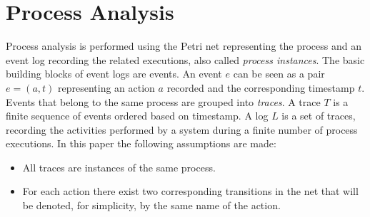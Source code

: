 \documentclass{llncs}
\begin{document}

\section{Process Analysis}\label{Background}
Process analysis is performed using the Petri net representing the process and an event log recording the related executions, also called \emph{process instances}. The basic building blocks of event logs are events. An event $e$ can be seen as a pair $e = (a,t)$ representing an action $a$ recorded and the corresponding timestamp $t$.  Events that belong to the same process are grouped into {\itshape traces}. A trace $T$ is a finite sequence of events ordered based on timestamp. A log $L$ is a set of traces, recording the activities performed by a system during a finite number of process executions.  In this paper the following assumptions are made:
\begin{itemize}
\item All traces are instances of the same process.
\item For each action there exist two corresponding transitions in the net that will be denoted, for simplicity, by the same name of the action.
\end{itemize}
\end{document}
